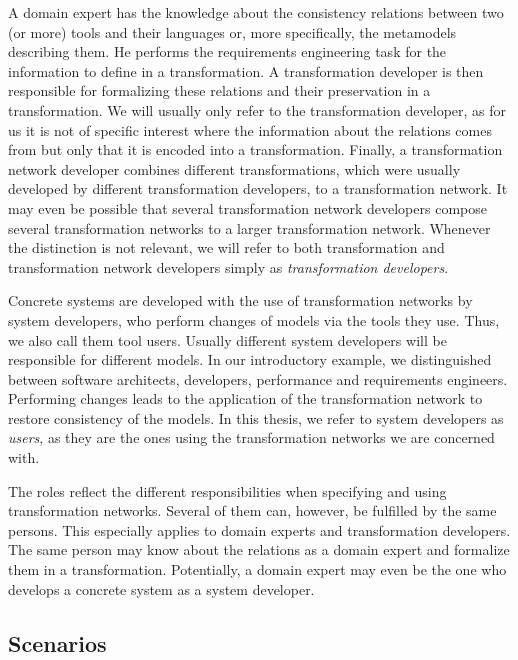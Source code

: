 A domain expert has the knowledge about the consistency relations between two (or more) tools and their languages or, more specifically, the metamodels describing them.
He performs the requirements engineering task for the information to define in a transformation.
A transformation developer is then responsible for formalizing these relations and their preservation in a transformation.
We will usually only refer to the transformation developer, as for us it is not of specific interest where the information about the relations comes from but only that it is encoded into a transformation.
Finally, a transformation network developer combines different transformations, which were usually developed by different transformation developers, to a transformation network.
It may even be possible that several transformation network developers compose several transformation networks to a larger transformation network. 
Whenever the distinction is not relevant, we will refer to both transformation and transformation network developers simply as \emph{transformation developers}.

Concrete systems are developed with the use of transformation networks by system developers, who perform changes of models via the tools they use.
Thus, we also call them tool users.
Usually different system developers will be responsible for different models.
In our introductory example, we distinguished between software architects, developers, performance and requirements engineers.
Performing changes leads to the application of the transformation network to restore consistency of the models.
In this thesis, we refer to system developers as \emph{users}, as they are the ones using the transformation networks we are concerned with.

The roles reflect the different responsibilities when specifying and using transformation networks.
Several of them can, however, be fulfilled by the same persons.
This especially applies to domain experts and transformation developers.
The same person may know about the relations as a domain expert and formalize them in a transformation.
Potentially, a domain expert may even be the one who develops a concrete system as a system developer.


\subsection{Scenarios}


